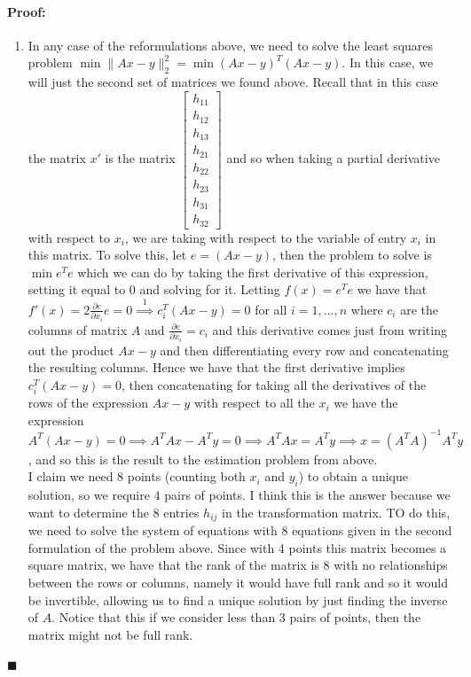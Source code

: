 \documentclass[12pt]{article}
\newenvironment{proof}{\paragraph{Proof: }}{\hfill$\blacksquare$}
\begin{document}
\begin{proof}
\begin{enumerate}
\item In any case of the reformulations above, we need to solve the least squares problem $\min \|Ax - y\|_2^2 = \min (Ax-y)^T (Ax-y)$. In this case, we will just the second set of matrices we found above. Recall that in this case the matrix $x'$ is the matrix $\left[\begin{matrix} h_{11} \\ h_{12} \\ h_{13} \\ h_{21} \\ h_{22} \\ h_{23} \\ h_{31} \\ h_{32} \end{matrix}\right]$ and so when taking a partial derivative with respect to $x_i$, we are taking with respect to the variable of entry $x_i$ in this matrix. To solve this, let $e = (Ax -y)$, then the problem to solve is $\min e^Te$ which we can do by taking the first derivative of this expression, setting it equal to 0 and solving for it. Letting $f(x) = e^Te$ we have that $f'(x) = 2 \frac{\partial e}{\partial x_i}e = 0 \stackrel{1}{\implies} c_i^T(Ax - y) = 0$ for all $i = 1,...,n$ where $c_i$ are the columns of matrix $A$ and $\frac{\partial e}{\partial x_i} = c_i$ and this derivative comes just from writing out the product $Ax-y$ and then differentiating every row and concatenating the resulting columns. Hence we have that the first derivative implies $c_i^T(Ax- y) = 0$, then concatenating for taking all the derivatives of the rows of the expression $Ax-y$ with respect to all the $x_i$ we have the expression $A^T(Ax - y) = 0 \implies A^TAx - A^Ty = 0 \implies A^TAx = A^Ty \implies x = (A^TA)^{-1}A^Ty$, and so this is the result to the estimation problem from above. \\

I claim we need $8$ points (counting both $x_i$ and $y_i$) to obtain a unique solution, so we require $4$ pairs of points. I think this is the answer because we want to determine the 8 entries $h_{ij}$ in the transformation matrix. TO do this, we need to solve the system of equations with 8 equations given in the second formulation of the problem above. Since with 4 points this matrix becomes a square matrix, we have that the rank of the matrix is 8 with no relationships between the rows or columns, namely it would have full rank and so it would be invertible, allowing us to find a unique solution by just finding the inverse of $A$. Notice that this if we consider less than 3 pairs of points, then the matrix might not be full rank.


\end{enumerate}
\end{proof}
\end{document}
